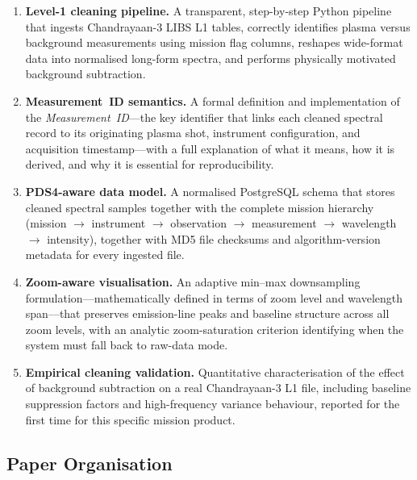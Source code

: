 \documentclass[a4paper,twocolumn,10pt]{article}
\begin{document}
\begin{enumerate}[label=\textbf{(C\arabic*)},leftmargin=*,itemsep=3pt]
  \item \textbf{Level-1 cleaning pipeline.}  A transparent,
    step-by-step Python pipeline that ingests Chandrayaan-3 LIBS L1
    tables, correctly identifies plasma versus background measurements
    using mission flag columns, reshapes wide-format data into
    normalised long-form spectra, and performs physically motivated
    background subtraction.

  \item \textbf{Measurement~ID semantics.}  A formal definition and
    implementation of the \emph{Measurement~ID}---the key identifier
    that links each cleaned spectral record to its originating plasma
    shot, instrument configuration, and acquisition timestamp---with a
    full explanation of what it means, how it is derived, and why it
    is essential for reproducibility.

  \item \textbf{PDS4-aware data model.}  A normalised PostgreSQL
    schema that stores cleaned spectral samples together with the
    complete mission hierarchy (mission $\rightarrow$ instrument
    $\rightarrow$ observation $\rightarrow$ measurement $\rightarrow$
    wavelength $\rightarrow$ intensity), together with MD5 file
    checksums and algorithm-version metadata for every ingested file.

  \item \textbf{Zoom-aware visualisation.}  An adaptive min--max
    downsampling formulation---mathematically defined in terms of
    zoom level and wavelength span---that preserves emission-line peaks
    and baseline structure across all zoom levels, with an analytic
    zoom-saturation criterion identifying when the system must fall
    back to raw-data mode.

  \item \textbf{Empirical cleaning validation.}  Quantitative
    characterisation of the effect of background subtraction on a real
    Chandrayaan-3 L1 file, including baseline suppression factors and
    high-frequency variance behaviour, reported for the first time for
    this specific mission product.
\end{enumerate}

\subsection{Paper Organisation}
\end{document}
